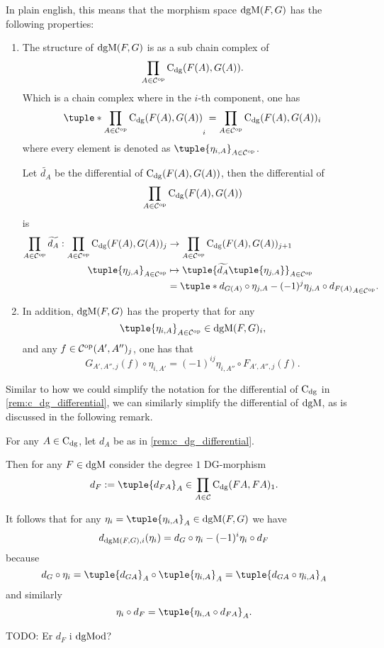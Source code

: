 In plain english, this means that the morphism space \( \operatorname{dgM}(F, G) \) has the following properties:
\begin{enumerate}
    \item {
        The structure of \( \operatorname{dgM}(F, G) \) is as a sub chain complex of
        \[
            \prod_{A \in {\mathcal{C}}^{\operatorname{op}}} \operatorname{C}_{\operatorname{dg}}(F(A), G(A)).
        \]
        Which is a chain complex where in the \( i \)-th component, one has
        \[
            \tuple*{ \prod_{A \in \Cc^{\op}} \C_{\dg}(F(A), G(A)) }_i = \prod_{A \in \Cc^{\op}} \C_{\dg}(F(A), G(A))_i
        \]
        where every element is denoted as \( \tuple{ \eta_{i, A} }_{A \in \Cc^{\op}} \).

        Let \( \widetilde{d_A} \) be the differential of \( \operatorname{C}_{\operatorname{dg}}(F(A), G(A)) \), then the differential of
        \[
            \prod_{A \in {\mathcal{C}}^{\operatorname{op}}} \operatorname{C}_{\operatorname{dg}}(F(A), G(A))
        \]
        is
        \begin{align*}
            \prod_{A \in \Cc^{\op}} \widetilde{d_A} : \prod_{A \in \Cc^{\op}} \C_{\dg}(F(A), G(A))_j &\to \prod_{A \in \Cc^{\op}} \C_{\dg}(F(A), G(A))_{j + 1} \\
            \tuple{ \eta_{j, A} }_{A \in \Cc^{\op}} &\mapsto \tuple{ \widetilde{d_A}\tuple{ \eta_{j, A} } }_{A \in \Cc^{\op}} \\
            &= \tuple*{ d_{G(A)} \circ \eta_{j, A} - (-1)^j \eta_{j, A} \circ d_{F(A)} }_{A \in \Cc^{\op}}.
        \end{align*}
    }
    \item {
        In addition, \( \operatorname{dgM}(F, G) \) has the property that for any
        \[
            \tuple{ \eta_{i, A} }_{A \in \Cc^{\op}} \in \dgM(F, G)_i,
        \]
        and any \( f \in {\mathcal{C}}^{\operatorname{op}}(A', A'')_j \), one has that
        \[
            G_{A', A'', j}(f) \circ \eta_{i, A'} = (-1)^{ij} \eta_{i, A''} \circ F_{A', A'', j}(f).
        \]
    }
\end{enumerate}

Similar to how we could simplify the notation for the differential of \( \operatorname{C}_{\operatorname{dg}} \) in \autoref{rem:c_dg_differential}, we can similarly simplify the differential of \( \operatorname{dgM} \), as is discussed in the following remark.

\begin{remark}
    For any \( A \in \operatorname{C}_{\operatorname{dg}} \), let \( d_A \) be as in \autoref{rem:c_dg_differential}.

    Then for any \( F \in \operatorname{dgM} \) consider the degree \( 1 \) DG-morphism
    \[
        d_F := \tuple{d_{FA}}_A \in \prod_{A \in \Cc} \C_{\dg}(FA, FA)_1.
    \]

    It follows that for any \( \eta_i = \tuple{\eta_{i, A}}_A \in \dgM(F, G) \) we have
    \[
        d_{\operatorname{dgM}(F, G), i}(\eta_i) = d_G \circ \eta_i - (-1)^i \eta_i \circ d_F
    \]
    because
    \[
        d_G \circ \eta_i = \tuple{d_{G A}}_A \circ \tuple{\eta_{i, A}}_A = \tuple{d_{G A} \circ \eta_{i, A}}_A
    \]
    and similarly
    \[
        \eta_i \circ d_F = \tuple{\eta_{i, A} \circ d_{F A}}_A.
    \]

    TODO: Er \( d_F \) i \( \operatorname{dgMod} \)?
\end{remark}

